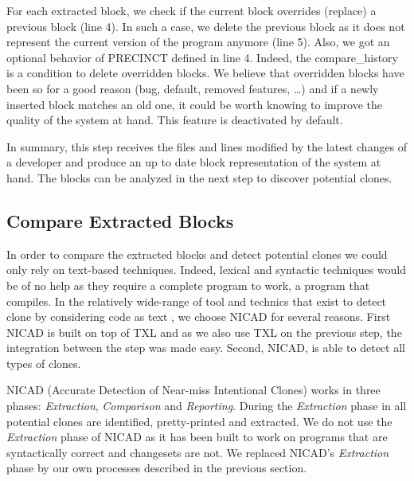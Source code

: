 \documentclass[conference]{IEEEtran}
\begin{document}
For each extracted block, we check if the current block overrides (replace) a previous block (line 4).
In such a case, we delete the previous block as it does not represent the current version of the program anymore (line 5).
Also, we got an optional behavior of PRECINCT defined in line 4.
Indeed, the compare\_history is a condition to delete overridden blocks.
We believe that overridden blocks have been so for a good reason (bug, default, removed features, \ldots) and if a newly inserted block matches an old one, it could be worth knowing to improve the quality of the system at hand.
This feature is deactivated by default.

In summary, this step receives the files and lines modified by the latest changes of a developer and produce an up to date block representation of the system at hand.
The blocks can be analyzed in the next step to discover potential clones.

\subsection{Compare Extracted Blocks}
\label{sub:Compare Extracted Blocks}

In order to compare the extracted blocks and detect potential clones we could only rely on text-based techniques.
Indeed, lexical and syntactic techniques would be of no help as they require a complete program to work, a program that compiles.
In the relatively wide-range of tool and technics that exist to detect clone by considering code as text \cite{Johnson1993,Johnson1994,Marcus,Manber1994,StephaneDucasse,Wettel2005}, we choose NICAD \cite{Cordy2011} for several reasons.
First NICAD is built on top of TXL and as we also use TXL on the previous step, the integration between the step was made easy.
Second, NICAD, is able to detect all types of clones.

NICAD (Accurate Detection of Near-miss Intentional Clones) works in three phases: \textit{Extraction}, \textit{Comparison} and \textit{Reporting}.
During the \textit{Extraction} phase in all potential clones are identified, pretty-printed and extracted.
We do not use the \textit{Extraction} phase of NICAD as it has been built to work on programs that are syntactically correct and changesets are not.
We replaced NICAD's \textit{Extraction} phase by our own processes described in the previous section.
\end{document}
